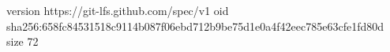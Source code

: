 version https://git-lfs.github.com/spec/v1
oid sha256:658fc84531518c9114b087f06ebd712b9be75d1e0a4f42eec785e63cfe1fd80d
size 72
